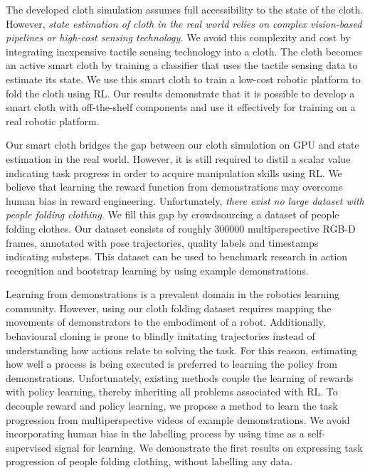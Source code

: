 \documentclass[\home/main.tex]{subfiles}
\begin{document}
The developed cloth simulation assumes full accessibility to the state of the cloth. However, \emph{state estimation of cloth in the real world relies on complex vision-based pipelines or high-cost sensing technology.} We avoid this complexity and cost by integrating inexpensive tactile sensing technology into a cloth. The cloth becomes an active smart cloth by training a classifier that uses the tactile sensing data to estimate its state. We use this smart cloth to train a low-cost robotic platform to fold the cloth using \gls{RL}. Our results demonstrate that it is possible to develop a smart cloth with off-the-shelf components and use it effectively for training on a real robotic platform. 

Our smart cloth bridges the gap between our cloth simulation on GPU and state estimation in the real world.
However, it is still required to distil a scalar value indicating task progress in order to acquire manipulation skills using \gls{RL}. We believe that learning the reward function from demonstrations may overcome human bias in reward engineering. Unfortunately, \emph{there exist no large dataset with people folding clothing}. We fill this gap by crowdsourcing a dataset of people folding clothes. Our dataset consists of roughly \qty{300000}{} multiperspective RGB-D frames, annotated with pose trajectories, quality labels and timestamps indicating substeps. This dataset can be used to benchmark research in action recognition and bootstrap learning by using example demonstrations. 

Learning from demonstrations is a prevalent domain in the robotics learning community. However, using our cloth folding dataset requires mapping the movements of demonstrators to the embodiment of a robot. Additionally, behavioural cloning is prone to blindly imitating trajectories instead of understanding how actions relate to solving the task. For this reason, estimating how well a process is being executed is preferred to learning the policy from demonstrations. Unfortunately, existing methods couple the learning of rewards with policy learning, thereby inheriting all problems associated with \gls{RL}.  
To decouple reward and policy learning, we propose a method to learn the task progression from multiperspective videos of example demonstrations. We avoid incorporating human bias in the labelling process by using time as a self-supervised signal for learning. We demonstrate the first results on expressing task progression of people folding clothing, without labelling any data. 
\end{document}
